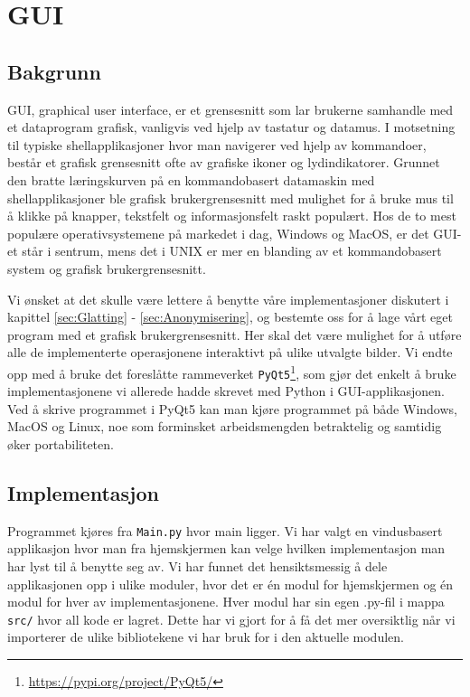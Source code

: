 \newpage
\section{GUI}
\label{sec:Gui}
\subsection{Bakgrunn}
GUI, graphical user interface, er et grensesnitt som lar brukerne samhandle med et dataprogram grafisk, vanligvis ved hjelp av tastatur og datamus. I motsetning til typiske shellapplikasjoner hvor man navigerer ved hjelp av kommandoer, består et grafisk grensesnitt ofte av grafiske ikoner og lydindikatorer\cite{wiki:GUI}. Grunnet den bratte læringskurven på en kommandobasert datamaskin med shellapplikasjoner ble grafisk brukergrensesnitt med mulighet for å bruke mus til å klikke på knapper, tekstfelt og informasjonsfelt raskt populært. Hos de to mest populære operativsystemene på markedet i dag, Windows og MacOS, er det GUI-et står i sentrum, mens det i UNIX er mer en blanding av et kommandobasert system og grafisk brukergrensesnitt.

Vi ønsket at det skulle være lettere å benytte våre implementasjoner diskutert i kapittel \ref{sec:Glatting} - \ref{sec:Anonymisering}, og bestemte oss for å lage vårt eget program med et grafisk brukergrensesnitt. Her skal det være mulighet for å utføre alle de implementerte operasjonene interaktivt på ulike utvalgte bilder. Vi endte opp med å bruke det foreslåtte rammeverket \texttt{PyQt5}\footnote{\url{https://pypi.org/project/PyQt5/}}, som gjør det enkelt å bruke implementasjonene vi allerede hadde skrevet med Python i GUI-applikasjonen. Ved å skrive programmet i PyQt5 kan man kjøre programmet på både Windows, MacOS og Linux, noe som forminsket arbeidsmengden betraktelig og samtidig øker portabiliteten.

\subsection{Implementasjon}
\label{sec:GUIimpl}
Programmet kjøres fra \texttt{Main.py} hvor main ligger. Vi har valgt en vindusbasert applikasjon hvor man fra hjemskjermen kan velge hvilken implementasjon man har lyst til å benytte seg av. Vi har funnet det hensiktsmessig å dele applikasjonen opp i ulike moduler, hvor det er én modul for hjemskjermen og én modul for hver av implementasjonene. Hver modul har sin egen .py-fil i mappa \texttt{src/} hvor all kode er lagret. Dette har vi gjort for å få det mer oversiktlig når vi importerer de ulike bibliotekene vi har bruk for i den aktuelle modulen.

